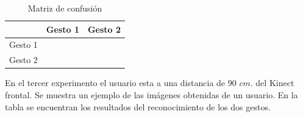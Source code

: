 \begin{table}[h!] 
\begin{center}
\begin{tabular}{ r || c | c |} 
 
        & Gesto 1 & Gesto 2 \\ \hline \hline  
Gesto 1 &      &       \\ \hline  
Gesto 2 &      &     \\   

\end{tabular}
\end{center} 
\caption{Matriz de confusión}
\end{table} 


En el tercer experimento el usuario esta a una distancia de $90$ $cm.$ del Kinect frontal. Se muestra un ejemplo de las imágenes obtenidas de un usuario. En la tabla se encuentran los resultados del reconocimiento de los dos gestos.    

